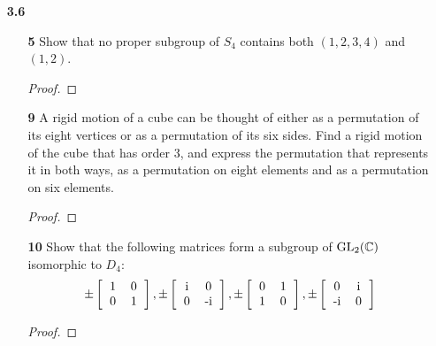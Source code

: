 \documentclass[paper=usletter, fontsize=12pt]{article}
\begin{document}

    \begin{itemize}

        \item[\textbf{3.6}]
        \begin{itemize}

            \item[\textbf{5}] Show that no proper subgroup of $S_4$ contains
            both $(1, 2, 3, 4)$ and $(1, 2)$.
            \begin{proof}
            \end{proof}

            \item[\textbf{9}] A rigid motion of a cube can be thought of either
            as a permutation of its eight vertices or as a permutation of its
            six sides. Find a rigid motion of the cube that has order 3, and
            express the permutation that represents it in both ways, as a
            permutation on eight elements and as a permutation on six elements.
            \begin{proof}
            \end{proof}

            \item[\textbf{10}] Show that the following matrices form a subgroup
            of $\text{GL}_2(\mathbb{C})$ isomorphic to $D_4$:
            \begin{equation*}
                \pm\left[\begin{tabular}{cc}
                            1 & 0 \\
                            0 & 1
                \end{tabular}\right],
                \pm\left[\begin{tabular}{cc}
                            i & 0 \\
                            0 & -i
                \end{tabular}\right],
                \pm\left[\begin{tabular}{cc}
                            0 & 1 \\
                            1 & 0
                \end{tabular}\right],
                \pm\left[\begin{tabular}{cc}
                            0 & i \\
                            -i & 0
                \end{tabular}\right]
            \end{equation*}
            \begin{proof}
            \end{proof}


\end{itemize}
\end{itemize}
\end{document}
